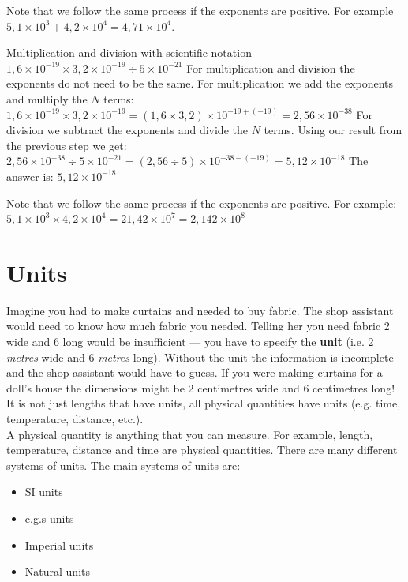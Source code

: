 Note that we follow the same process if the exponents are positive. For example $5,1 \times 10^{3} + 4,2 \times 10^{4} = 4,71 \times 10^{4}$. 
\begin{wex}{Multiplication and division with scientific notation}
 {$1,6 \times 10^{-19} \times 3,2 \times 10^{-19} \div 5 \times 10^{-21} $}
{ 
For multiplication and division the exponents do not need to be the same. For multiplication we add the exponents and multiply the $N$ terms:\\
$1,6 \times 10^{-19} \times 3,2 \times 10^{-19} = (1,6 \times 3,2) \times 10^{-19 + (-19)} = 2,56 \times 10^{-38}$
For division we subtract the exponents and divide the $N$ terms. Using our result from the previous step we get:\\
$2,56 \times 10^{-38} \div 5 \times 10^{-21} = (2,56 \div 5) \times 10^{-38 - (-19)} = 5,12 \times 10^{-18}$
The answer is: $5,12 \times 10^{-18}$
}
\end{wex}
Note that we follow the same process if the exponents are positive. For example: $5,1 \times 10^{3} \times 4,2 \times 10^{4} = 21,42 \times 10^{7} = 2,142 \times 10^{8}$
\section{Units}
Imagine you had to make curtains and needed to buy fabric. The shop assistant would need to know how much fabric you needed. Telling her you need fabric 2 wide and 6 long would be insufficient --- you have to specify the \textbf{unit} (i.e. 2 \textsl{metres} wide and 6 \textsl{metres} long). Without the unit the information is incomplete and the shop assistant would have to guess. If you were making curtains for a doll's house the dimensions might be 2 centimetres wide and 6 centimetres long!\\ 
It is not just lengths that have units, all physical quantities have units (e.g. time, temperature, distance, etc.).\\
 { A physical quantity is anything that you can measure. For example, length, temperature, distance and time are physical quantities.} 
There are many different systems of units. The main systems of units are: 
\begin{itemize}
 \item SI units
\item c.g.s units
\item Imperial units
\item Natural units
\end{itemize}
